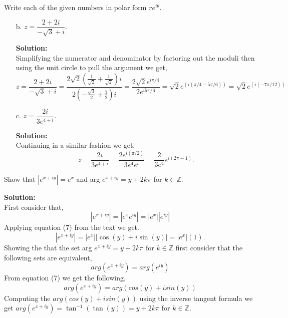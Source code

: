 \documentclass[12pt]{article}
\makeatletter
\theoremstyle{homework}
\newenvironment{exercise}[1]
{\def\@currentlabel{#1}\exercisecore}
{\endexercisecore}
\newcommand{\localhead}[1]{\par\smallskip\noindent\textbf{#1}\nobreak\\}%
\newcommand\solution{\localhead{Solution:}}
\makeatother
\begin{document}
\begin{exercise}{4} Write each of the given numbers in polar form $re^{i\theta}$.\\
    \begin{enumerate}
        \item[b.] $z = \dfrac{2 + 2i}{-\sqrt{3} + i}$.
        \solution  Simplifying the numerator and denominator by factoring out the moduli then using the unit circle to pull the argument we get, 
        \begin{equation*}
            z = \dfrac{2 + 2i}{-\sqrt{3} + i} = \dfrac{2\sqrt{2}(\frac{1}{\sqrt{2}} + \frac{1}{\sqrt{2}})i}{2(-\frac{\sqrt{3}}{2} + \frac{1}{2})i} = \dfrac{2\sqrt{2}e^{i\pi/4}}{2e^{i5\pi/6}} = \sqrt{2}e^{(i(\pi/4 - 5\pi/6))} = \sqrt{2}e^{(i(-7\pi/12))}
        \end{equation*}
        
        
        \item[c.] $z = \dfrac{2i}{3e^{4 + i}}$.\\
        \solution Continuing in a similar fashion we get, 
        \begin{equation*}
            z = \dfrac{2i}{3e^{4 + i}} =\dfrac{2e^{i(\pi/2)}}{3e^{4}e^i} = \dfrac{2}{3e^4} e^{i(2\pi-1)}.  
        \end{equation*}
    \end{enumerate}
    
\end{exercise}
\vspace{.15in}




\begin{exercise}{5} Show that $|e^{x + iy}| = e^x$ and arg $e^{x + iy} = y + 2k\pi$ for $k \in \mathbb{Z}$.\\
    \solution First consider that, 
    \begin{equation*}
        |e^{x + iy}| = |e^{x}e^{iy}| = |e^{x}||e^{iy}| 
    \end{equation*}
    Applying equation (7) from the text we get. 
    \begin{equation*}
        |e^{x + iy}| = |e^{x}||\cos(y) + i\sin(y)| = |e^{x}|(1). 
    \end{equation*} 
    Showing the that the set arg  $e^{x + iy} = y + 2k\pi$ for $k \in \mathbb{Z}$ first consider that the following sets are equivalent, 
    \begin{equation*}
        arg (e^{x + iy}) = arg (e^{iy}) 
    \end{equation*}
    From equation (7) we get the following, 
    \begin{equation*}
        arg (e^{x + iy}) = arg (cos(y) + i sin(y)) 
    \end{equation*}
    Computing the $arg (cos(y) + i sin(y))$ using the inverse tangent formula we get $arg (e^{x + iy}) = \tan^{-1}(\tan(y)) =  y + 2k\pi$ for $k \in \mathbb{Z}$. 
    
\end{exercise}
\vspace{.15in}
\end{document}
